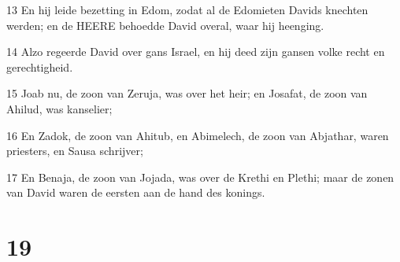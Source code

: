 \par 13 En hij leide bezetting in Edom, zodat al de Edomieten Davids knechten werden; en de HEERE behoedde David overal, waar hij heenging.
\par 14 Alzo regeerde David over gans Israel, en hij deed zijn gansen volke recht en gerechtigheid.
\par 15 Joab nu, de zoon van Zeruja, was over het heir; en Josafat, de zoon van Ahilud, was kanselier;
\par 16 En Zadok, de zoon van Ahitub, en Abimelech, de zoon van Abjathar, waren priesters, en Sausa schrijver;
\par 17 En Benaja, de zoon van Jojada, was over de Krethi en Plethi; maar de zonen van David waren de eersten aan de hand des konings.

\chapter{19}

